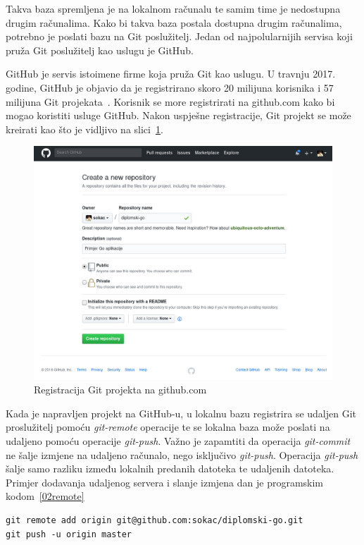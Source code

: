Takva baza spremljena je na lokalnom računalu te samim time je nedostupna drugim računalima. Kako bi
takva baza postala dostupna drugim računalima, potrebno je poslati bazu na Git poslužitelj. Jedan
od najpolularnijih servisa koji pruža Git poslužitelj kao uslugu je GitHub.

GitHub je servis istoimene firme koja pruža Git kao uslugu. U travnju 2017. godine, GitHub je
objavio da je registrirano skoro 20 milijuna korisnika i 57 milijuna Git
projekata~\citep{github2017}. Korisnik se more registrirati na github.com kako bi mogao koristiti
usluge GitHub. Nakon uspješne registracije, Git projekt se može kreirati kao što je vidljivo na
slici~\ref{fig:02hgreg}.

\begin{figure}[h]
    \centering
    \includegraphics[width=0.7\linewidth]{img/02/gh.png}
    \caption{Registracija Git projekta na github.com}%
    \label{fig:02hgreg}
\end{figure}

Kada je napravljen projekt na GitHub-u, u lokalnu bazu registrira se udaljen Git proslužitelj pomoću
\textit{git-remote} operacije te se lokalna baza može poslati na udaljeno pomoću operacije
\textit{git-push}. Važno je zapamtiti da operacija \textit{git-commit} ne šalje izmjene na udaljeno
računalo, nego isključivo \textit{git-push}.  Operacija \textit{git-push} šalje samo razliku između
lokalnih predanih datoteka te udaljenih datoteka.  Primjer dodavanja udaljenog servera i slanje
izmjena dan je programskim kodom~\ref{02remote}

\begin{minipage}{\linewidth}
\begin{lstlisting}
git remote add origin git@github.com:sokac/diplomski-go.git
git push -u origin master
\end{lstlisting}
\end{minipage}

